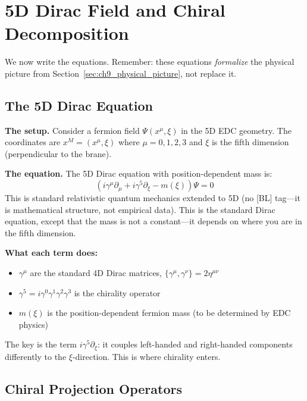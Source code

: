 \section{5D Dirac Field and Chiral Decomposition}
\label{sec:ch9_dirac}

We now write the equations. Remember: these equations \emph{formalize} the
physical picture from Section~\ref{sec:ch9_physical_picture}, not replace it.

\subsection{The 5D Dirac Equation}

\textbf{The setup.} Consider a fermion field $\Psi(x^\mu, \xi)$ in the 5D EDC geometry.
The coordinates are $x^M = (x^\mu, \xi)$ where $\mu = 0,1,2,3$ and $\xi$ is
the fifth dimension (perpendicular to the brane).

\textbf{The equation.} The 5D Dirac equation with position-dependent mass is:
\begin{equation}
    \left( i\gamma^\mu \partial_\mu + i\gamma^5 \partial_\xi - m(\xi) \right) \Psi = 0
    \label{eq:ch9_5d_dirac}
\end{equation}
This is standard relativistic quantum mechanics extended to 5D (no [BL] tag---it is
mathematical structure, not empirical data).
This is the standard Dirac equation, except that the mass is not a constant---it
depends on where you are in the fifth dimension.

\textbf{What each term does:}
\begin{itemize}[nosep]
    \item $\gamma^\mu$ are the standard 4D Dirac matrices, $\{\gamma^\mu, \gamma^\nu\} = 2\eta^{\mu\nu}$
    \item $\gamma^5 = i\gamma^0\gamma^1\gamma^2\gamma^3$ is the chirality operator
    \item $m(\xi)$ is the position-dependent fermion mass (to be determined by EDC physics)
\end{itemize}

The key is the term $i\gamma^5 \partial_\xi$: it couples left-handed and right-handed
components differently to the $\xi$-direction. This is where chirality enters.

\subsection{Chiral Projection Operators}

